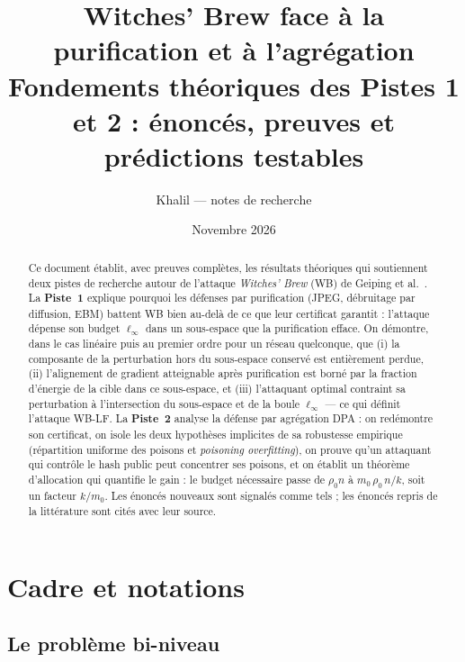 \documentclass[11pt,a4paper]{article}
\title{\textbf{Witches' Brew face à la purification et à l'agrégation}\\[4pt]
\large Fondements théoriques des Pistes 1 et 2 : énoncés, preuves et prédictions testables}
\author{Khalil --- notes de recherche}
\date{Novembre 2026}
\theoremstyle{plain}
\theoremstyle{definition}
\theoremstyle{remark}
\begin{document}
\maketitle

\begin{abstract}
Ce document établit, avec preuves complètes, les résultats théoriques qui soutiennent deux
pistes de recherche autour de l'attaque \emph{Witches' Brew} (WB) de Geiping et al.~\cite{geiping2021}.
La \textbf{Piste~1} explique pourquoi les défenses par purification (JPEG, débruitage par diffusion,
EBM) battent WB bien au-delà de ce que leur certificat garantit : l'attaque dépense son budget
$\ell_\infty$ dans un sous-espace que la purification efface. On démontre, dans le cas linéaire puis
au premier ordre pour un réseau quelconque, que (i) la composante de la perturbation hors du
sous-espace conservé est entièrement perdue, (ii) l'alignement de gradient atteignable après
purification est borné par la fraction d'énergie de la cible dans ce sous-espace, et (iii)
l'attaquant optimal contraint sa perturbation à l'intersection du sous-espace et de la boule
$\ell_\infty$ --- ce qui définit l'attaque WB-LF. La \textbf{Piste~2} analyse la défense par
agrégation DPA : on redémontre son certificat, on isole les deux hypothèses implicites de sa
robustesse empirique (répartition uniforme des poisons et \emph{poisoning overfitting}), on prouve
qu'un attaquant qui contrôle le hash public peut concentrer ses poisons, et on établit un théorème
d'allocation qui quantifie le gain : le budget nécessaire passe de $\rho_0 n$ à $m_0\,\rho_0\,n/k$,
soit un facteur $k/m_0$. Les énoncés nouveaux sont signalés comme tels ; les énoncés repris de la
littérature sont cités avec leur source.
\end{abstract}

\tableofcontents

\section{Cadre et notations}

\subsection{Le problème bi-niveau}
\end{document}
